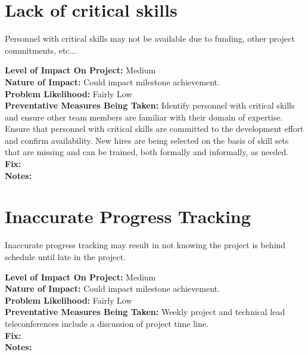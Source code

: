 \documentclass[english]{article}
\newcommand{\req}[1]{\section{\hspace{.2in}#1}}
\newenvironment
{reqlist}
{\begin{list} {} {} \rm \item[]}
{\end{list}}
\begin{document}
\req{Lack of critical skills}
Personnel with critical skills may not be available due to funding, other
project commitments, etc...
\begin{reqlist}
{\bf Level of Impact On Project:} Medium \\
{\bf Nature of Impact:} Could impact milestone achievement.\\
{\bf Problem Likelihood:} Fairly Low \\
{\bf Preventative Measures Being Taken:}
Identify personnel with critical skills and ensure other team
members are familiar with their domain of expertise.
Ensure that personnel with critical skills are committed
to the development effort and confirm availability.
New hires are being selected on the basis of skill sets that are
missing and can be trained, both formally and informally, as needed.
\\
{\bf Fix:}\\
{\bf Notes:} 
\end{reqlist}

\req{Inaccurate Progress Tracking}
Inaccurate progress tracking may result in not knowing the project is
behind schedule until late in the project.
\begin{reqlist}
{\bf Level of Impact On Project:} Medium \\
{\bf Nature of Impact:} Could impact milestone achievement.\\
{\bf Problem Likelihood:} Fairly Low \\
{\bf Preventative Measures Being Taken:}
Weekly project and technical lead teleconferences
include a discussion of project time line.
\\
{\bf Fix:}\\
{\bf Notes:} 
\end{reqlist}
\end{document}
